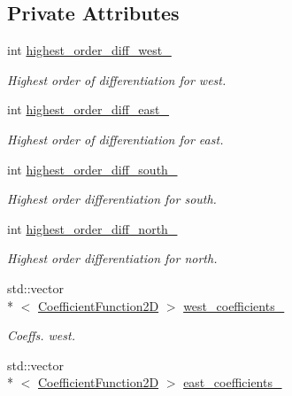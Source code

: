 \subsection*{Private Attributes}
\begin{DoxyCompactItemize}
\item 
int \hyperlink{classmtk_1_1BCDescriptor2D_aa18ef62f8eda355e47f51bcb5dbe8fe7}{highest\+\_\+order\+\_\+diff\+\_\+west\+\_\+}
\begin{DoxyCompactList}\small\item\em Highest order of differentiation for west. \end{DoxyCompactList}\item 
int \hyperlink{classmtk_1_1BCDescriptor2D_aea5e539a10d5641bd605ebe583c14bc5}{highest\+\_\+order\+\_\+diff\+\_\+east\+\_\+}
\begin{DoxyCompactList}\small\item\em Highest order of differentiation for east. \end{DoxyCompactList}\item 
int \hyperlink{classmtk_1_1BCDescriptor2D_a1fb094e5e53ecfba32fe9fe56c051c47}{highest\+\_\+order\+\_\+diff\+\_\+south\+\_\+}
\begin{DoxyCompactList}\small\item\em Highest order differentiation for south. \end{DoxyCompactList}\item 
int \hyperlink{classmtk_1_1BCDescriptor2D_a6cdeefe70f5bef93196f34ab2949cad2}{highest\+\_\+order\+\_\+diff\+\_\+north\+\_\+}
\begin{DoxyCompactList}\small\item\em Highest order differentiation for north. \end{DoxyCompactList}\item 
std\+::vector\\*
$<$ \hyperlink{group__c07-mim__ops_gad9e1c0ace886b0029aefffa5f320e852}{Coefficient\+Function2\+D} $>$ \hyperlink{classmtk_1_1BCDescriptor2D_a7df71b43acc25c468683075cc7790bb2}{west\+\_\+coefficients\+\_\+}
\begin{DoxyCompactList}\small\item\em Coeffs. west. \end{DoxyCompactList}\item 
std\+::vector\\*
$<$ \hyperlink{group__c07-mim__ops_gad9e1c0ace886b0029aefffa5f320e852}{Coefficient\+Function2\+D} $>$ \hyperlink{classmtk_1_1BCDescriptor2D_a1f90fc303984bf18c136a34896bbb7c9}{east\+\_\+coefficients\+\_\+}

\end{DoxyCompactItemize}
